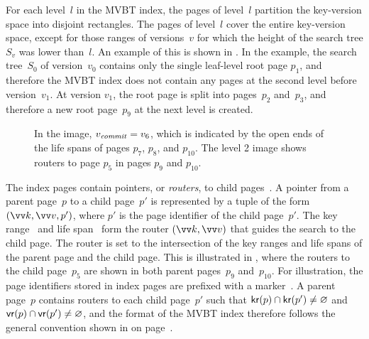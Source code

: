 For each level~$l$ in the MVBT index, the pages of level~$l$ partition the
key-version space into disjoint rectangles. 
The pages of level~$l$ cover the entire key-version space, except for
those ranges of versions~$v$ for which the height of the search tree $S_v$
was lower than~$l$. 
An example of this is shown in . 
In the example, the search tree~$S_0$ of version~$v_0$ contains only the
single leaf-level root page $p_1$, and therefore the MVBT index does not
contain any pages at the second level before version~$v_1$.
At version $v_1$, the root page is split into pages~$p_2$ and~$p_3$, and
therefore a new root page~$p_9$ at the next level is created.

\begin{figure}[htb]
\begin{center}
\subfigure[Level 1]{
\label{fig:mvbt-space-partition:level-1}}
\subfigure[Level 2]{
\label{fig:mvbt-space-partition:level-2}}
%
{In the image, $\smash{v_{\text{\textit{commit}}}} = v_6$, which is indicated by the open ends of the
life spans of pages $p_7$, $p_8$, and $p_{10}$.
The level \num{2} image shows routers to page $p_5$ in pages $p_9$ and
$p_{10}$.}
\label{fig:mvbt-space-partition}
\end{center}
\end{figure}

The index pages contain pointers, or \emph{routers}, to child
pages~\cite{becker:1993:optimal,becker:1996:mvbt}.
A pointer from a parent page~$p$ to a child page~$p'$ is represented by a
tuple of the form $(\vrmark{k}, \vrmark{v}, p')$, where $p'$ is the
page identifier of the child page~$p'$.
The key range~ and life span~ form the router
$(\vrmark{k}, \vrmark{v})$ that guides the search to the child page. 
The router is set to the intersection of the key ranges and life spans of
the parent page and the child page.
This is illustrated in , where the
routers to the child page~$p_5$ are shown in both parent pages~$p_9$
and~$p_{10}$.
For illustration, the page identifiers stored in index pages are prefixed with
a marker~\ptr. 
A parent page~$p$ contains routers to each child page~$p'$ such that
$\text{\textsf{kr}}(p) \cap \text{\textsf{kr}}(p') \neq \varnothing$ and $\text{\textsf{vr}}(p) \cap \text{\textsf{vr}}(p') \neq
\varnothing$, and the format of the MVBT index therefore follows the general
convention shown in  on
page~\pageref{fig:sv-mv-index-comparison:mv}.

